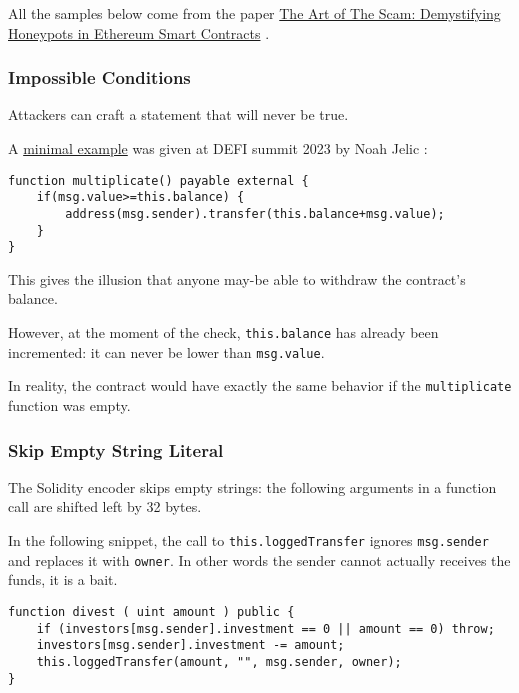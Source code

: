 All the samples below come from the paper \href{https://arxiv.org/pdf/1902.06976.pdf}{The Art of The Scam: Demystifying Honeypots in Ethereum Smart Contracts} \cite{paper-art-of-the-scam}.

\subsubsection{Impossible Conditions}

Attackers can craft a statement that will never be true.

A \href{https://www.youtube.com/watch?v=4bSQWoy5a_k}{minimal example} was given at DEFI summit 2023 by Noah Jelic \cite{video-hacker-traps}:

\begin{lstlisting}[language=Solidity]
function multiplicate() payable external {
    if(msg.value>=this.balance) {
        address(msg.sender).transfer(this.balance+msg.value);
    }
}
\end{lstlisting}

This gives the illusion that anyone may-be able to withdraw the contract's balance.

However, at the moment of the check, \lstinline[language=Solidity]{this.balance} has already been incremented: it can never be lower than \lstinline[language=Solidity]{msg.value}.

In reality, the contract would have exactly the same behavior if the \lstinline{multiplicate} function was empty.

\subsubsection{Skip Empty String Literal}

The Solidity encoder skips empty strings: the following arguments in a function call are shifted left by 32 bytes.

In the following snippet, the call to \lstinline[language=Solidity]{this.loggedTransfer} ignores \lstinline[language=Solidity]{msg.sender} and replaces it with \lstinline[language=Solidity]{owner}.
In other words the sender cannot actually receives the funds, it is a bait.

\begin{lstlisting}[language=Solidity]
function divest ( uint amount ) public {
    if (investors[msg.sender].investment == 0 || amount == 0) throw;
    investors[msg.sender].investment -= amount;
    this.loggedTransfer(amount, "", msg.sender, owner);
}
\end{lstlisting}

